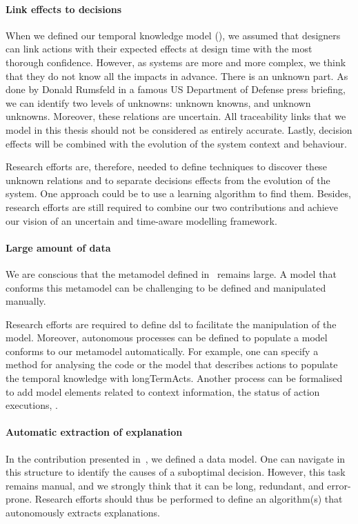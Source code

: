 \paragraph{Link effects to decisions}
When we defined our temporal knowledge model (\cf {}), we assumed that designers can link \glspl{action} with their expected effects at design time with the most thorough confidence. 
However, as systems are more and more complex, we think that they do not know all the impacts in advance.
There is an unknown part.
As done by Donald Rumsfeld in a famous US Department of Defense press briefing, we can identify two levels of unknowns: unknown knowns, and unknown unknowns.
Moreover, these relations are uncertain.
All traceability links that we model in this thesis should not be considered as entirely accurate.
Lastly, decision effects will be combined with the evolution of the system context and behaviour.

Research efforts are, therefore, needed to define techniques to discover these unknown relations and to separate decisions effects from the evolution of the system.
One approach could be to use a learning algorithm to find them.
Besides, research efforts are still required to combine our two contributions and achieve our vision of an uncertain and time-aware modelling framework.

\paragraph{Large amount of data}
We are conscious that the \gls{metamodel} defined in~ remains large.
A \gls{model} that conforms this \gls{metamodel} can be challenging to be defined and manipulated manually.

Research efforts are required to define \gls{dsl} to facilitate the manipulation of the \gls{model}.
Moreover, autonomous processes can be defined to populate a \gls{model} conforms to our \gls{metamodel} automatically.
For example, one can specify a method for analysing the code or the model that describes \glspl{action} to populate the temporal knowledge with \glspl{longTermAct}.
Another process can be formalised to add \gls{model} elements related to context information, the status of action executions, \etc.

\paragraph{Automatic extraction of explanation}
In the contribution presented in~, we defined a data model.
One can navigate in this structure to identify the causes of a suboptimal decision.
However, this task remains manual, and we strongly think that it can be long, redundant, and error-prone.
Research efforts should thus be performed to define an algorithm(s) that autonomously extracts explanations.

